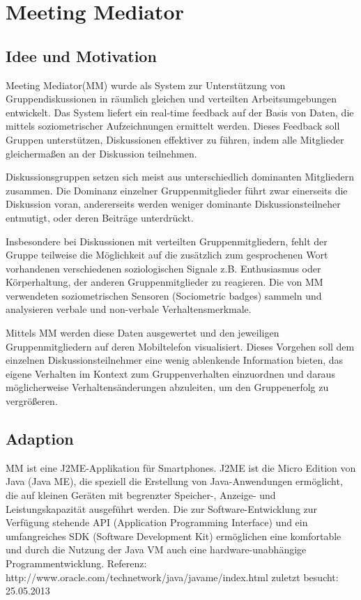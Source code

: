 \section{Meeting Mediator}

\subsection{Idee und Motivation}
Meeting Mediator(MM) \cite{KimChaHolPent2008} wurde als System zur
Un\-ter\-stütz\-ung von Gruppendiskussionen in räumlich gleichen und verteilten
Arbeitsumgebungen entwickelt. Das System liefert ein real-time feedback auf der
Basis von Daten, die mittels soziometrischer Aufzeichnungen ermittelt werden.
Dieses Feedback soll Gruppen unterstützen, Diskussionen effektiver zu führen,
indem alle Mitglieder gleichermaßen an der Diskussion teilnehmen.

Diskussionsgruppen setzen sich meist aus unterschiedlich dominanten Mitgliedern
zusammen. Die Dominanz einzelner Gruppenmitglieder führt zwar einerseits die
Diskussion voran, andererseits werden weniger dominante Diskussionsteilneher 
entmutigt, oder deren Beiträge un\-ter\-drückt.

Insbesondere bei Diskussionen mit verteilten Gruppenmitgliedern, fehlt der
Gruppe teilweise die Möglichkeit auf die zusätzlich zum gesprochenen Wort
vorhandenen verschiedenen soziologischen Signale z.B. Enthusiasmus oder
Körperhaltung, der anderen Gruppenmitglieder zu reagieren.
Die von MM verwendeten soziometrischen Sensoren (Sociometric badges)
\cite{MITbadge} sammeln und analysieren verbale und non-verbale
Verhaltensmerkmale.

Mittels MM werden diese Daten ausgewertet und den jeweiligen Gruppenmitgliedern
auf deren Mobiltelefon visualisiert. Dieses Vorgehen soll dem einzelnen
Diskussionsteilnehmer eine wenig ablenkende Information bieten, das eigene
Verhalten im Kontext zum Gruppenverhalten einzuordnen und daraus möglicherweise
Ver\-hal\-tens\-än\-de\-run\-gen abzuleiten, um den Gruppenerfolg zu
vergrößeren.

\subsection{Adaption}

MM ist eine J2ME-Applikation für Smartphones. J2ME ist die Micro Edition von
Java (Java ME), die speziell die Erstellung von Java-Anwendungen ermöglicht, die
auf kleinen Geräten mit begrenzter Speicher-, Anzeige- und Leistungskapazität
ausgeführt werden. Die zur Software-Ent\-wick\-lung zur Verfügung stehende API
(Application Programming Interface) und ein umfangreiches SDK (Software
Development Kit) ermöglichen eine komfortable und durch die Nutzung der Java VM
auch eine hardware-unabhängige Programmentwicklung. Referenz:
http://www.oracle.com/technetwork/java/javame/index.html zuletzt besucht:
25.05.2013

